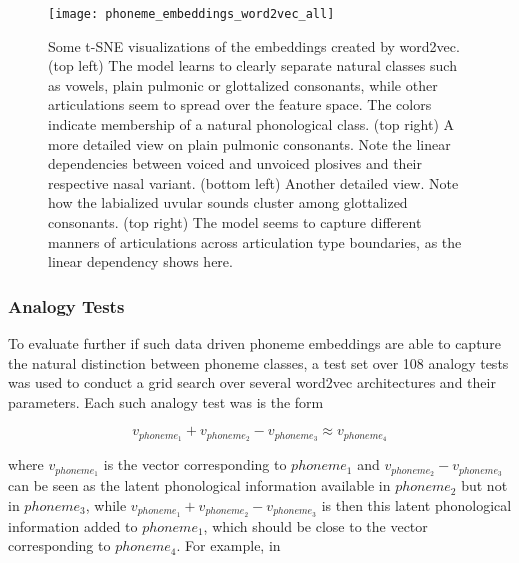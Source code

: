 \documentclass[6pt]{article}
\begin{document}
\begin{figure}[h!] %
   \centering
   \texttt{[image: phoneme\_embeddings\_word2vec\_all]} 
   \caption{Some t-SNE visualizations of the embeddings created by word2vec. (top left) The model learns to clearly separate natural classes such as vowels, plain pulmonic or glottalized consonants, while other articulations seem to spread over the feature space. The colors indicate membership of a natural phonological class.  (top right) A more detailed view on plain pulmonic consonants. Note the linear dependencies between voiced and unvoiced plosives and their respective nasal variant. (bottom left) Another detailed view. Note how the labialized uvular sounds cluster among glottalized consonants. (top right) The model seems to capture different manners of articulations across articulation type boundaries, as the linear dependency shows here.}
   \label{fig:phoneme_embeddings_word2vec_all}
\end{figure}

\subsubsection{Analogy Tests}
To evaluate further if such data driven phoneme embeddings are able to capture the natural distinction between phoneme classes, a test set over 108 analogy tests was used to conduct a grid search over several word2vec architectures and their parameters. Each such analogy test was is the form

\begin{equation}
v_{phoneme_1} + v_{phoneme_2} -  v_{phoneme_3} \approx v_{phoneme_4}
\end{equation} 

where $v_{phoneme_1}$ is the vector corresponding to $phoneme_1$ and $v_{phoneme_2} -  v_{phoneme_3}$ can be seen as the latent phonological information available in $phoneme_2$ but not in $phoneme_3$,  while $v_{phoneme_1} + v_{phoneme_2} -  v_{phoneme_3}$ is then this latent phonological information added to $phoneme_1$, which should be close to the vector corresponding to $phoneme_4$. For example, in
\end{document}
